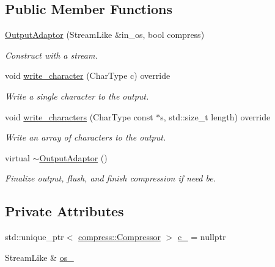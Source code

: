 \subsection*{Public Member Functions}
\begin{DoxyCompactItemize}
\item 
\hyperlink{structvt_1_1util_1_1json_1_1_output_adaptor_a7a8ffe897d20ef9637522d7745d40842}{Output\+Adaptor} (Stream\+Like \&in\+\_\+os, bool compress)
\begin{DoxyCompactList}\small\item\em Construct with a stream. \end{DoxyCompactList}\item 
void \hyperlink{structvt_1_1util_1_1json_1_1_output_adaptor_a78b899ff96a6540a7f50545c2d527602}{write\+\_\+character} (Char\+Type c) override
\begin{DoxyCompactList}\small\item\em Write a single character to the output. \end{DoxyCompactList}\item 
void \hyperlink{structvt_1_1util_1_1json_1_1_output_adaptor_a15247f9d55e0fb68e91031360be5952d}{write\+\_\+characters} (Char\+Type const $\ast$s, std\+::size\+\_\+t length) override
\begin{DoxyCompactList}\small\item\em Write an array of characters to the output. \end{DoxyCompactList}\item 
virtual \hyperlink{structvt_1_1util_1_1json_1_1_output_adaptor_af564b111175dfa476ac7e942b5378012}{$\sim$\+Output\+Adaptor} ()
\begin{DoxyCompactList}\small\item\em Finalize output, flush, and finish compression if need be. \end{DoxyCompactList}\end{DoxyCompactItemize}
\subsection*{Private Attributes}
\begin{DoxyCompactItemize}
\item 
std\+::unique\+\_\+ptr$<$ \hyperlink{structvt_1_1util_1_1compress_1_1_compressor}{compress\+::\+Compressor} $>$ \hyperlink{structvt_1_1util_1_1json_1_1_output_adaptor_a13ebcf1c0ce85c2f255d72af9f9b6422}{c\+\_\+} = nullptr
\item 
Stream\+Like \& \hyperlink{structvt_1_1util_1_1json_1_1_output_adaptor_aef3a9e890ea22507fe71186a33dd8aff}{os\+\_\+}
\end{DoxyCompactItemize}


